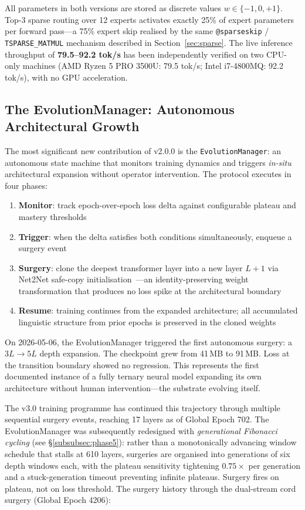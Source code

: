 \documentclass[11pt,a4paper]{article}
\begin{document}
All parameters in both versions are stored as discrete values $w \in \{-1, 0, +1\}$.
Top-3 sparse routing over 12 experts activates exactly 25\% of expert parameters per
forward pass---a 75\% expert skip realised by the same \texttt{@sparseskip} /
\texttt{TSPARSE\_MATMUL} mechanism described in Section~\ref{sec:sparse}. The
live inference throughput of \textbf{79.5--92.2 tok/s} has been independently
verified on two CPU-only machines (AMD Ryzen 5 PRO 3500U: 79.5 tok/s;
Intel i7-4800MQ: 92.2 tok/s), with no GPU acceleration.

\subsection{The EvolutionManager: Autonomous Architectural Growth}

The most significant new contribution of v2.0.0 is the \texttt{EvolutionManager}:
an autonomous state machine that monitors training dynamics and triggers
\emph{in-situ} architectural expansion without operator intervention. The
protocol executes in four phases:

\begin{enumerate}
  \item \textbf{Monitor}: track epoch-over-epoch loss delta against configurable
        plateau and mastery thresholds
  \item \textbf{Trigger}: when the delta satisfies both conditions simultaneously,
        enqueue a surgery event
  \item \textbf{Surgery}: clone the deepest transformer layer into a new
        layer $L{+}1$ via Net2Net safe-copy initialisation~\cite{chen2016net2net}---an
        identity-preserving weight transformation that produces no loss spike at
        the architectural boundary
  \item \textbf{Resume}: training continues from the expanded architecture;
        all accumulated linguistic structure from prior epochs is preserved in
        the cloned weights
\end{enumerate}

On 2026-05-06, the EvolutionManager triggered the first autonomous surgery:
a $3L \to 5L$ depth expansion. The checkpoint grew from 41\,MB to 91\,MB.
Loss at the transition boundary showed no regression. This represents the first
documented instance of a fully ternary neural model expanding its own
architecture without human intervention---the substrate evolving itself.

The v3.0 training programme has continued this trajectory through multiple
sequential surgery events, reaching 17 layers as of Global Epoch 702. The
EvolutionManager was subsequently redesigned with \emph{generational Fibonacci cycling}
(see \S\ref{subsubsec:phase5}): rather than a monotonically advancing window schedule
that stalls at 610 layers, surgeries are organised into generations of six depth windows
each, with the plateau sensitivity tightening $0.75\times$ per generation and a
stuck-generation timeout preventing infinite plateaus. Surgery fires on plateau, not
on loss threshold. The surgery history through the dual-stream cord surgery (Global Epoch 4206):
\end{document}
